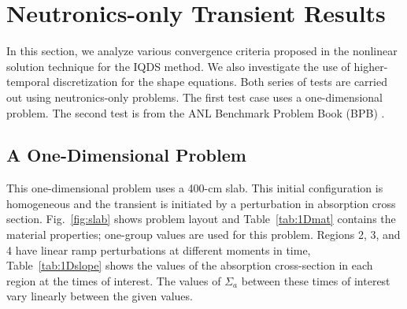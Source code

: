 \documentclass{elsarticle}
\newcommand{\fig}[1]{Fig.~\ref{#1}}                      %
\newcommand{\tbl}[1]{Table~\ref{#1}}                     %
\begin{document}

\section{Neutronics-only Transient Results}

In this section, we analyze various convergence criteria proposed in the nonlinear solution technique for the IQDS method. We also investigate the use of higher-temporal discretization for the shape equations. Both series of tests are carried out using neutronics-only problems.  The first test case uses a one-dimensional problem. The second test is from the ANL Benchmark Problem Book (BPB) \cite{ANL_BPB}.

\subsection{A One-Dimensional Problem}

This one-dimensional problem uses a 400-cm slab. This initial configuration is homogeneous and the transient is initiated by a perturbation in absorption cross section. \fig{fig:slab} shows problem layout and \tbl{tab:1Dmat} contains the material properties; one-group values are used for this problem. Regions 2, 3, and 4 have linear ramp perturbations at different moments in time, \tbl{tab:1Dslope} shows the values of the absorption cross-section in each region at the times of interest.  The values of $\Sigma_a$ between these times of interest vary linearly between the given values.
\end{document}
